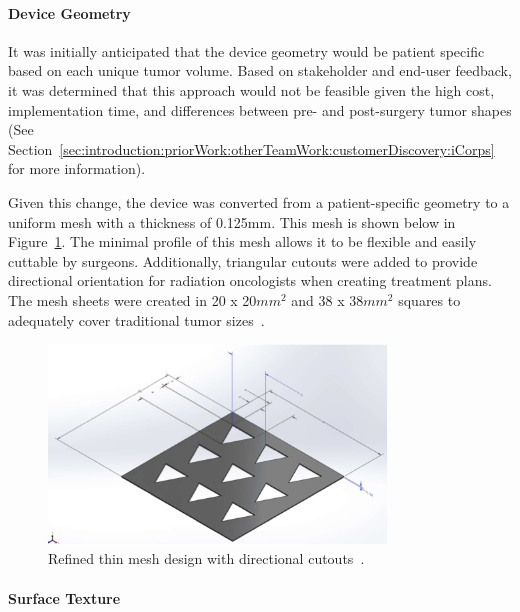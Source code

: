 \paragraph*{Device Geometry\label{introduction:priorWork:otherTeamWork:deviceDesign:deviceGeometry}}

It was initially anticipated that the device geometry would be patient specific based on each unique tumor volume. Based on stakeholder and end-user feedback, it was determined that this approach would not be feasible given the high cost, implementation time, and differences between pre- and post-surgery tumor shapes (See Section~\ref{sec:introduction:priorWork:otherTeamWork:customerDiscovery:iCorps} for more information).

Given this change, the device was converted from a patient-specific geometry to a uniform mesh with a thickness of 0.125mm. This mesh is shown below in Figure~\ref{fig:introduction:initialThinMeshDesign}. The minimal profile of this mesh allows it to be flexible and easily cuttable by surgeons. Additionally, triangular  cutouts were added to provide directional orientation for radiation oncologists when creating treatment plans. The mesh sheets were created in 20 x 20$mm^2$ and 38 x 38$mm^2$ squares to adequately cover traditional tumor sizes~\cite{RefWorks:RefID:371-bakhtardesign}.

\begin{figure}[h!]
        \centering
        \includegraphics[width=0.8\textwidth]{../figs/introduction/thin_flat_mesh_design_with_cutouts.png}
        \caption{Refined thin mesh design with directional cutouts~\cite{RefWorks:RefID:371-bakhtardesign}.}
        \label{fig:introduction:initialThinMeshDesign}
\end{figure}

\paragraph*{Surface Texture\label{introduction:priorWork:otherTeamWork:deviceDesign:surfaceTexture}}

